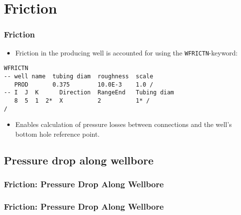 \section{Friction}

\begin{frame}[fragile]
    \frametitle{Friction}
    \begin{itemize}
        \item Friction in the producing well is accounted for using the \texttt{WFRICTN}-keyword:
    \end{itemize}

\vspace{1em}

    \begin{code}
        \begin{verbatim}
WFRICTN
-- well name  tubing diam  roughness  scale
   PROD       0.375        10.0E-3    1.0 /
-- I  J  K      Direction  RangeEnd   Tubing diam
   8  5  1  2*  X          2          1* /
/
        \end{verbatim}
    \end{code}

    \begin{itemize}
        \item Enables calculation of pressure losses between connections and the well's bottom hole reference point.
    \end{itemize}

\end{frame}


\subsection{Pressure drop along wellbore}
\begin{frame}
    \frametitle{Friction: Pressure Drop Along Wellbore}
    \centerline{}
\end{frame}


\begin{frame}
    \frametitle{Friction: Pressure Drop Along Wellbore}
    \centerline{}
\end{frame}


